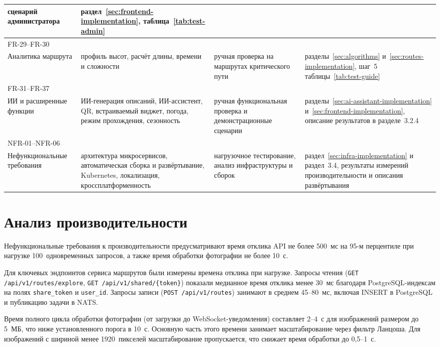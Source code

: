 \begin{longtable}{|p{3.6cm}|p{3.5cm}|p{3.1cm}|p{3.6cm}|}
сценарий администратора &
раздел~\ref{sec:frontend-implementation}, таблица~\ref{tab:test-admin} \\
\hline
FR-29--FR-30\\Аналитика маршрута &
профиль высот, расчёт длины, времени и сложности &
ручная проверка на маршрутах критического пути &
разделы~\ref{sec:algorithms} и~\ref{sec:routes-implementation}, шаг~5 таблицы~\ref{tab:test-guide} \\
\hline
FR-31--FR-37\\ИИ и расширенные функции &
ИИ-генерация описаний, ИИ-ассистент, QR, встраиваемый виджет, погода, режим прохождения, сезонность &
ручная функциональная проверка и демонстрационные сценарии &
разделы~\ref{sec:ai-assistant-implementation} и~\ref{sec:frontend-implementation}, описание результатов в разделе~3.2.4 \\
\hline
NFR-01--NFR-06\\Нефункцио\-нальные требования &
архитектура микросервисов, автоматическая сборка и развёртывание, Kubernetes, локализация, кроссплатформенность &
нагрузочное тестирование, анализ инфраструктуры и сборок &
раздел~\ref{sec:infra-implementation} и раздел~3.4, результаты измерений производительности и описания развёртывания \\
\hline
\end{longtable}

\section{Анализ производительности}

Нефункциональные требования к производительности предусматривают время отклика
API не более 500~мс на 95-м перцентиле при нагрузке 100~одновременных запросов,
а также время обработки фотографии не более 10~с.

Для ключевых эндпоинтов сервиса маршрутов были измерены времена отклика при нагрузке. Запросы чтения (\texttt{GET /api/v1/routes/explore}, \texttt{GET /api/v1/shared/\{token\}}) показали медианное время отклика менее 30~мс благодаря PostgreSQL-индексам на полях \texttt{share\_token} и \texttt{user\_id}. Запросы записи (\texttt{POST /api/v1/routes}) занимают в среднем 45--80~мс, включая INSERT в PostgreSQL и публикацию задачи в NATS.

Время полного цикла обработки фотографии (от загрузки до WebSocket-уведомления)
составляет 2--4~с для изображений размером до 5~МБ, что ниже установленного
порога в 10~с. Основную часть этого времени занимает масштабирование через
фильтр Ланцоша. Для изображений с шириной менее 1920~пикселей масштабирование
пропускается, что снижает время обработки до 0,5--1~с.

